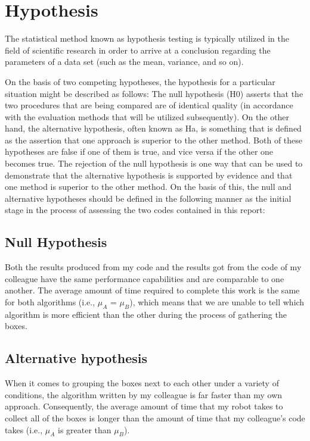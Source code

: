 \section{Hypothesis}\label{P2}
The statistical method known as hypothesis testing is typically utilized 
in the field of scientific research in order to arrive at a conclusion regarding 
the parameters of a data set (such as the mean, variance, and so on).
\par
On the basis of two competing hypotheses, the hypothesis for a particular situation 
might be described as follows: The null hypothesis (H0) asserts that the two procedures 
that are being compared are of identical quality 
(in accordance with the evaluation methods that will be utilized subsequently). 
On the other hand, the alternative hypothesis, often known as Ha, is something that is 
defined as the assertion that one approach is superior to the other method. 
Both of these hypotheses are false if one of them is true, and vice versa if the other 
one becomes true. The rejection of the null hypothesis is one way that can be used to 
demonstrate that the alternative hypothesis is supported by evidence and that one method 
is superior to the other method. On the basis of this, the null and alternative hypotheses 
should be defined in the following manner as the initial stage in the process of assessing 
the two codes contained in this report:

\subsection{Null Hypothesis}
Both the results produced from my code and the results got from the code of  my colleague 
have the same performance capabilities and are comparable to one another. 
The average amount of time required to complete this work is the same for both algorithms 
(i.e., $\mu_A$ = $\mu_B$), which means that we are unable to tell which algorithm is more efficient 
than the other during the process of gathering the boxes.

\subsection{Alternative hypothesis}
When it comes to grouping the boxes next to each other under a variety of conditions, 
the algorithm written by my colleague is far faster than my own approach. Consequently, 
the average amount of time that my robot takes to collect all of the boxes is longer 
than the amount of time that my colleague's code takes (i.e., $\mu_A$ is greater than $\mu_B$).

